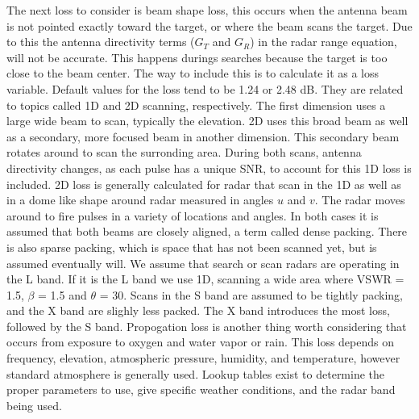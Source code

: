 \documentclass[12pt]{article}
\begin{document}
The next loss to consider is beam shape loss, this occurs when the antenna beam is not pointed exactly toward the target, or where the beam scans the target. Due to this the antenna directivity terms ($G_T$ and $G_R$) in the radar range equation, will not be accurate. This happens durings searches because the target is too close to the beam center. The way to include this is to calculate it as a loss variable. Default values for the loss tend to be 1.24 or 2.48 dB. They are related to topics called 1D and 2D scanning, respectively. The first dimension uses a large wide beam to scan, typically the elevation. 2D uses this broad beam as well as a secondary, more focused beam in another dimension. This secondary beam rotates around to scan the surronding area. During both scans, antenna directivity changes, as each pulse has a unique SNR, to account for this 1D loss is included. 2D loss is generally calculated for radar that scan in the 1D as well as in a dome like shape around radar measured in angles $u$ and $v$. The radar moves around to fire pulses in a variety of locations and angles.
In both cases it is assumed that both beams are closely aligned, a term called dense packing. There is also sparse packing, which is space that has not been scanned yet, but is assumed eventually will. We assume that search or scan radars are operating in the L band. If it is the L band we use 1D, scanning a wide area where VSWR = 1.5, $\beta$ = 1.5 and $\theta$ = 30. Scans in the S band are assumed to be tightly packing, and the X band are slighly less packed. The X band introduces the most loss, followed by the S band.
Propogation loss is another thing worth considering that occurs from exposure to oxygen and water vapor or rain. This loss depends on frequency, elevation, atmospheric pressure, humidity, and temperature, however standard atmosphere is generally used. Lookup tables exist to determine the proper parameters to use, give specific weather conditions, and the radar band being used.
\end{document}
